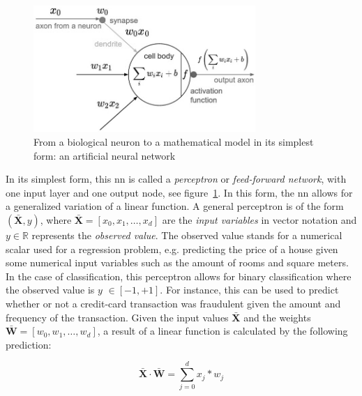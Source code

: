 \documentclass[draft,final]{vutinfth} %
\begin{document}
    \begin{figure}[h]
        \centering
        \includegraphics[width=0.75\textwidth]{figures/neuron_model.png}
        \caption[From a biological neuron to a mathematical model: an artificial neural network in its simplest form]{From a biological neuron to a mathematical model in its simplest form: an artificial neural network\protect\footnotemark}
        \label{fig:neuron_model}
    \end{figure}


    In its simplest form, this \gls{nn} is called a \textit{perceptron} or \textit{feed-forward network}, with one input layer and one output node, see figure~\ref{fig:neuron_model}.
    In this form, the \gls{nn} allows for a generalized variation of a linear function.
    A general perceptron is of the form $(\bar{\boldsymbol{X}},y)$, where $\bar{\boldsymbol{X}}=[x_0,x_1,\ldots,x_d]$ are the \textit{input variables} in vector notation and $y \in \mathbb{R}$  represents the \textit{observed value}.
    The observed value stands for a numerical scalar used for a regression problem, e.g. predicting the price of a house given some numerical input variables such as the amount of rooms and square meters.
    In the case of classification, this perceptron allows for binary classification where the observed value is $y$ $\in [-1,+1]$.
    For instance, this can be used to predict whether or not a credit-card transaction was fraudulent given the amount and frequency of the transaction.
    Given the input values $\bar{\boldsymbol{X}}$ and the weights $\bar{\boldsymbol{W}}=[w_0,w_1,\ldots,w_d]$, a result of a linear function is calculated by the following prediction:

    \begin{equation}
        \bar{\boldsymbol{X}}\cdot\bar{\boldsymbol{W}}=\sum_{j=0}^{d}x_j*w_j\label{eq:feed_forward_equation}
    \end{equation}
\end{document}

